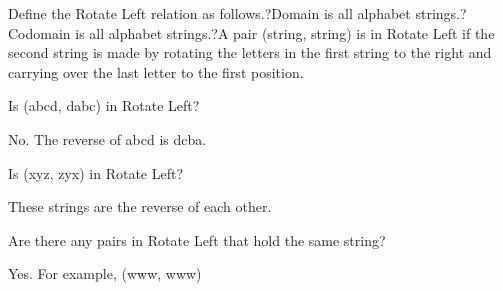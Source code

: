 \documentclass{ximera}
\begin{document}
\begin{question}

Define the Rotate Left relation as follows.?Domain is all alphabet strings.?Codomain is all alphabet strings.?A pair (string, string) is in Rotate Left if the second string is made by rotating the letters in the first string to the right and carrying over the last letter to the first position.


Is (abcd, dabc) in Rotate Left?
\begin{multipleChoice}
\end{multipleChoice}
\begin{feedback}
No. The reverse of abcd is dcba.
\end{feedback}


Is (xyz, zyx) in Rotate Left?
\begin{multipleChoice}
\end{multipleChoice}
\begin{feedback}
These strings are the reverse of each other.
\end{feedback}


Are there any pairs in Rotate Left that hold the same string?
\begin{multipleChoice}
\end{multipleChoice}
\begin{feedback}
Yes. For example, (www, www)
\end{feedback}

\end{question}
\end{document}
